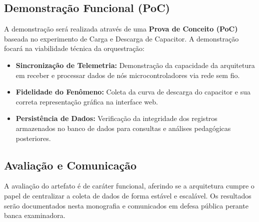 \subsection{Demonstração Funcional (PoC)}
A demonstração será realizada através de uma \textbf{Prova de Conceito (PoC)} baseada no experimento de Carga e Descarga de Capacitor. A demonstração focará na viabilidade técnica da orquestração:
\begin{itemize}
	\item \textbf{Sincronização de Telemetria:} Demonstração da capacidade da arquitetura em receber e processar dados de nós microcontroladores via rede sem fio.
	\item \textbf{Fidelidade do Fenômeno:} Coleta da curva de descarga do capacitor e sua correta representação gráfica na interface web.
	\item \textbf{Persistência de Dados:} Verificação da integridade dos registros armazenados no banco de dados para consultas e análises pedagógicas posteriores.
\end{itemize}

\subsection{Avaliação e Comunicação}
A avaliação do artefato é de caráter funcional, aferindo se a arquitetura cumpre o papel de centralizar a coleta de dados de forma estável e escalável. Os resultados serão documentados nesta monografia e comunicados em defesa pública perante banca examinadora.
